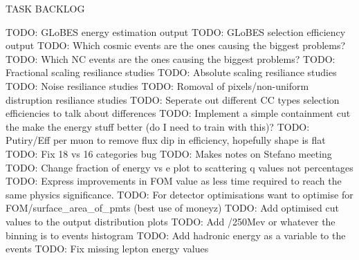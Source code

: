 TASK BACKLOG

TODO: GLoBES energy estimation output
TODO: GLoBES selection efficiency output
TODO: Which cosmic events are the ones causing the biggest problems?
TODO: Which NC events are the ones causing the biggest problems?
TODO: Fractional scaling resiliance studies
TODO: Absolute scaling resiliance studies
TODO: Noise resiliance studies
TODO: Romoval of pixels/non-uniform distruption resiliance studies
TODO: Seperate out different CC types selection efficiencies to talk about differences
TODO: Implement a simple containment cut the make the energy stuff better (do I need to train with this)?
TODO: Putiry/Eff per muon to remove flux dip in efficiency, hopefully shape is flat
TODO: Fix 18 vs 16 categories bug
TODO: Makes notes on Stefano meeting
TODO: Change fraction of energy vs e plot to scattering q values not percentages
TODO: Express improvements in FOM value as less time required to reach the same physics significance.
TODO: For detector optimisations want to optimise for FOM/surface_area_of_pmts (best use of moneyz)
TODO: Add optimised cut values to the output distribution plots
TODO: Add /250Mev or whatever the binning is to events histogram
TODO: Add hadronic energy as a variable to the events
TODO: Fix missing lepton energy values